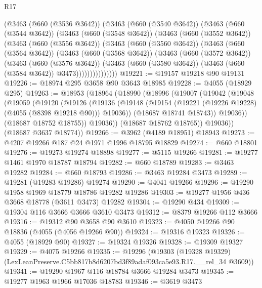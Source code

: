 \begin{lexlean}{R17}
\begin{coremodule}
        (@3463
          (@660 (@3536 @3642))
          (@3463
            (@660 (@3540 @3642))
            (@3463
              (@660 (@3544 @3642))
              (@3463
                (@660 (@3548 @3642))
                (@3463
                  (@660 (@3552 @3642))
                  (@3463
                    (@660 (@3556 @3642))
                    (@3463
                      (@660 (@3560 @3642))
                      (@3463
                        (@660 (@3564 @3642))
                        (@3463
                          (@660 (@3568 @3642))
                          (@3463
                            (@660 (@3572 @3642))
                            (@3463
                              (@660 (@3576 @3642))
                              (@3463
                                (@660 (@3580 @3642))
                                (@3463 (@660 (@3584 @3642)) @3473)))))))))))))))
@19221 := @19157 @19218 @90 @19131
@19226 := @18974 @295 @3658 @90 @3643 @18985
@19228 := @4055 (@18929 @295)
@19263 := @18953
    (@18964
      (@18990
        (@18996
          (@19007
            (@19042
              (@19048
                (@19059
                  (@19120
                    (@19126
                      (@19136
                        (@19148 (@19154 (@19221 (@19226 @19228) (@4055 (@8398 @19218 @90))) @19036))
                        (@18687 @18741 @18743))
                      @19036))
                  (@18687 @18752 @18755))
                @19036))
            (@18687 @18762 @18765))
          @19036))
      (@18687 @3637 @18774))
@19266 := @3962 (@4189 @18951) @18943
@19273 := @4207 @19266 @187 @24 @1971 @1996 @18795 @18829
@19274 := @660 @18801
@19276 := @19273 @19274 @18898
@19277 := @5115 @19266
@19281 := @19277 @1461 @1970 @18787 @18794
@19282 := @660 @18789
@19283 := @3463 @19282
@19284 := @660 @18793
@19286 := @3463 @19284 @3473
@19289 := @19281 (@19283 @19286) @19274
@19290 := @4041 @19266
@19296 := @19290 @1958 @1969 @18779 @18786 @19282 @19286
@19303 := @19277 @1956 @436 @3668 @18778 (@3611 @3473) @19282
@19304 := @19290 @434
@19309 := @19304 @116 @3666 @3666 @3610 @3473
@19312 := @8379 @19266 @112 @3666
@19316 := @19312 @90 @3658 @90 @3610
@19323 := @4050 @19266 @90 @18836 (@4055 (@4056 @19266 @90))
@19324 := @19316 @19323
@19326 := @4055 (@18929 @90)
@19327 := @19324 @19326
@19328 := @19309 @19327
@19329 := @4075 @19266
@19335 := @19296
    (@19303 (@19328 @19329) (LexLeanPreserve.C5bb817b8d6207bd3f89adaf093ca5e93.R17.__rel_34 @3609))
@19341 := @19290 @1967 @116 @18784 @3666 @19284 @3473
@19345 := @19277 @1963 @1966 @17036 @18783
@19346 := @3619 @3473

\end{coremodule}
\end{lexlean}

